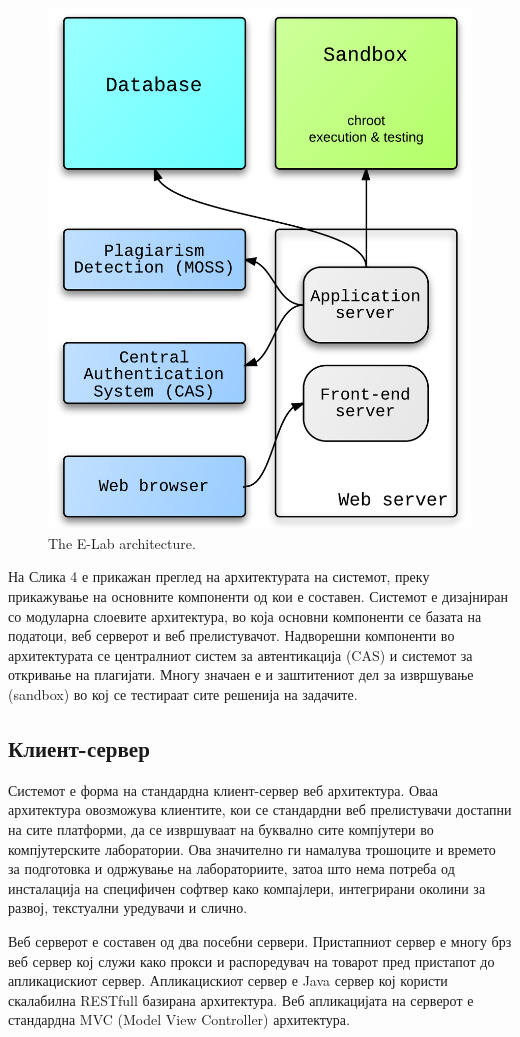 \documentclass[a4paper,twocolumn]{article}
\begin{document}
\begin{figure}[ht]  
\centering
\includegraphics[width=.45\textwidth]{images/architecture}
\caption{The E-Lab architecture.}
\label{fig:architecture}
\end{figure}

На Слика 4 е прикажан преглед на архитектурата на системот, преку прикажување на
основните компоненти од кои е составен. Системот е дизајниран со модуларна
слоевите архитектура, во која основни компоненти се базата на податоци, веб
серверот и веб прелистувачот. Надворешни компоненти во архитектурата се
централниот систем за автентикација (CAS) и системот за откривање на плагијати.
Многу значаен е и заштитениот дел за извршување (sandbox) во кој се тестираат
сите решенија на задачите.

\subsection{Клиент-сервер}

Системот е форма на стандардна клиент-сервер веб архитектура. Оваа архитектура
овозможува клиентите, кои се стандардни веб прелистувачи достапни на сите
платформи, да се извршуваат на буквално сите компјутери во компјутерските
лаборатории. Ова значително ги намалува трошоците и времето за подготовка и
одржување на лабораториите, затоа што нема потреба од инсталација на специфичен
софтвер како компајлери, интегрирани околини за развој, текстуални уредувачи и
слично.

Веб серверот е составен од два посебни сервери. Пристапниот сервер е многу брз
веб сервер кој служи како прокси и распоредувач на товарот пред пристапот до
апликацискиот сервер. Апликацискиот сервер е Java сервер кој користи скалабилна
RESTfull базирана архитектура. Веб апликацијата на серверот е стандардна MVC
(Model View Controller) архитектура.
\end{document}
